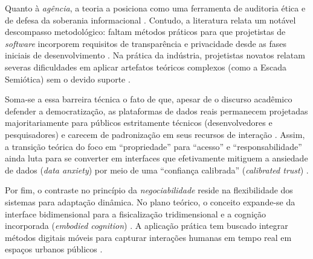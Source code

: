 \documentclass[
	12pt,				%
	oneside,			%
	a4paper,			%
	english,			%
	brazil				%
	]{abntex2ppgsi}
\begin{document}
    Quanto à \emph{agência}, a teoria a posiciona como uma ferramenta de auditoria ética e de defesa da soberania informacional \cite{coleti2024human, Meechan2023}. Contudo, a literatura relata um notável descompasso metodológico: faltam métodos práticos para que projetistas de \textit{software} incorporem requisitos de transparência e privacidade desde as fases iniciais de desenvolvimento \cite{Strey2019Human}. Na prática da indústria, projetistas novatos relatam severas dificuldades em aplicar artefatos teóricos complexos (como a Escada Semiótica) sem o devido suporte \cite{Strey2019Human}.
    
    Soma-se a essa barreira técnica o fato de que, apesar de o discurso acadêmico defender a democratização, as plataformas de dados reais permanecem projetadas majoritariamente para públicos estritamente técnicos (desenvolvedores e pesquisadores) e carecem de padronização em seus recursos de interação \cite{Belizario2023Interacao}. Assim, a transição teórica do foco em ``propriedade'' para ``acesso'' e ``responsabilidade'' \cite{janecek2018ownership} ainda luta para se converter em interfaces que efetivamente mitiguem a ansiedade de dados (\textit{data anxiety}) por meio de uma ``confiança calibrada'' (\textit{calibrated trust}) \cite{cezar2023cognitive}.
    
    Por fim, o contraste no princípio da \emph{negociabilidade} reside na flexibilidade dos sistemas para adaptação dinâmica. No plano teórico, o conceito expande-se da interface bidimensional para a fisicalização tridimensional e a cognição incorporada (\textit{embodied cognition}) \cite{DeKreij2024, Sailaja2024334}. A aplicação prática tem buscado integrar métodos digitais móveis para capturar interações humanas em tempo real em espaços urbanos públicos \cite{kaufmann2021ethical}.
    
\end{document}
